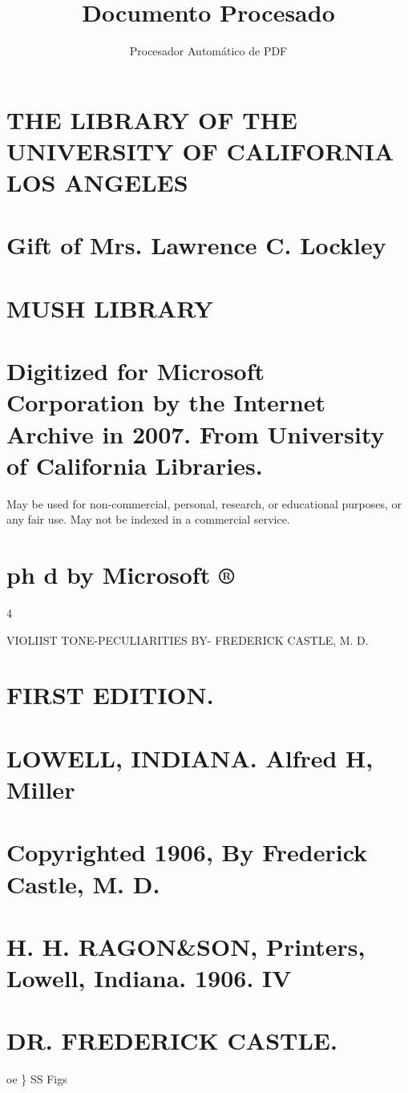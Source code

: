 \documentclass{article}
\title{Documento Procesado}
\author{Procesador Automático de PDF}
\date{}
\begin{document}
\maketitle

\section*{THE LIBRARY OF THE UNIVERSITY OF CALIFORNIA LOS ANGELES}
\section*{Gift of Mrs. Lawrence C. Lockley}
\section*{MUSH LIBRARY}
\section*{Digitized for Microsoft Corporation by the Internet Archive in 2007. From University of California Libraries.}
May be used for non-commercial, personal, research, or educational purposes, or any fair use. May not be indexed in a commercial service.

\section*{ph d by Microsoft ®}
4

VIOLIIST TONE-PECULIARITIES BY- FREDERICK CASTLE, M. D.

\section*{FIRST EDITION.}
\section*{LOWELL, INDIANA. Alfred H, Miller}
\section*{Copyrighted 1906, By Frederick Castle, M. D.}
\section*{H. H. RAGON\&SON, Printers, Lowell, Indiana. 1906. IV}
\section*{DR. FREDERICK CASTLE.}
oe \} SS Figs
\end{document}
